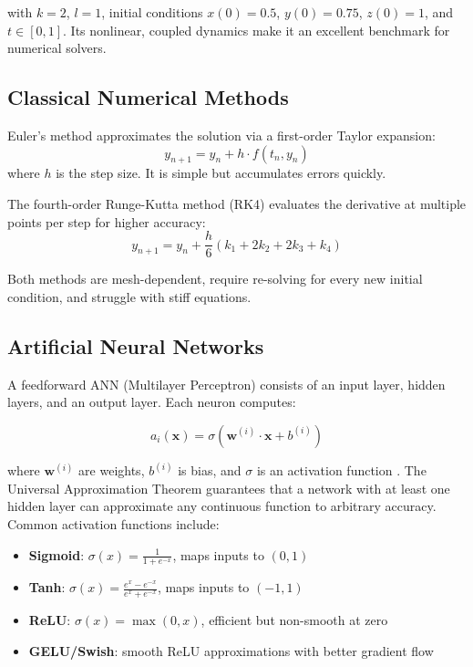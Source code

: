 with $k = 2$, $l = 1$, initial conditions $x(0) = 0.5$, $y(0) = 0.75$, $z(0) = 1$, and $t \in [0, 1]$. Its nonlinear, coupled dynamics make it an excellent benchmark for numerical solvers.

\subsection{Classical Numerical Methods}

Euler's method approximates the solution via a first-order Taylor expansion:
\begin{equation}
y_{n+1} = y_n + h \cdot f(t_n, y_n)
\end{equation}
where $h$ is the step size. It is simple but accumulates errors quickly.

The fourth-order Runge-Kutta method (RK4) evaluates the derivative at multiple points per step for higher accuracy:
\begin{equation}
y_{n+1} = y_n + \frac{h}{6}(k_1 + 2k_2 + 2k_3 + k_4)
\end{equation}

Both methods are mesh-dependent, require re-solving for every new initial condition, and struggle with stiff equations.

\subsection{Artificial Neural Networks}

A feedforward ANN (Multilayer Perceptron) consists of an input layer, hidden layers, and an output layer. Each neuron computes:

\begin{equation}
a_i(\mathbf{x}) = \sigma\left(\mathbf{w}^{(i)} \cdot \mathbf{x} + b^{(i)}\right)
\label{eq:neuron}
\end{equation}

where $\mathbf{w}^{(i)}$ are weights, $b^{(i)}$ is bias, and $\sigma$ is an activation function \cite{lau2020oden}. The Universal Approximation Theorem \cite{lau2020oden, babni2025error, hornik1989multilayer} guarantees that a network with at least one hidden layer can approximate any continuous function to arbitrary accuracy. Common activation functions include:
\begin{itemize}
    \item \textbf{Sigmoid}: $\sigma(x) = \frac{1}{1 + e^{-x}}$, maps inputs to $(0, 1)$
    \item \textbf{Tanh}: $\sigma(x) = \frac{e^x - e^{-x}}{e^x + e^{-x}}$, maps inputs to $(-1, 1)$
    \item \textbf{ReLU}: $\sigma(x) = \max(0, x)$, efficient but non-smooth at zero
    \item \textbf{GELU/Swish}: smooth ReLU approximations with better gradient flow
\end{itemize}

